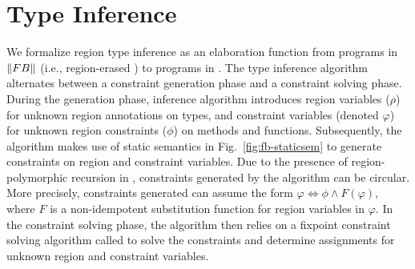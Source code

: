 \section{Type Inference}
\label{sec:type-inference}

We formalize region type inference as an elaboration function from
programs in $\left\| {\sc FB} \right\|$ (i.e., region-erased \FB) to programs in
\FB.  The type inference algorithm alternates between a constraint
generation phase and a constraint solving phase. During the generation
phase, inference algorithm introduces region variables ($\rho$) for
unknown region annotations on types, and constraint variables (denoted
$\varphi$) for unknown region constraints ($\phi$) on methods and
functions. Subsequently, the algorithm makes use of static semantics
in Fig.~\ref{fig:fb-staticsem} to generate constraints on region and
constraint variables. Due to the presence of region-polymorphic
recursion in \FB, constraints generated by the algorithm can be
circular. More precisely, constraints generated can assume the form
$\varphi \Leftrightarrow \phi \wedge F(\varphi)$, where $F$ is a
non-idempotent substitution function for region variables in
$\varphi$. In the constraint solving phase, the algorithm then relies
on a fixpoint constraint solving algorithm called \csolvestar to solve
the constraints and determine assignments for unknown region and
constraint variables.



